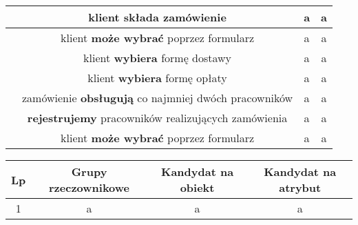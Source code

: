 \documentclass[a4page]{article}
\begin{document}
\begin{table}
\begin{adjustwidth}{-4.5cm}{}
\begin{tabular}{|c|c|c|c|}
				\hline
					\next & klient \textbf{składa} zamówienie & a & a\\
				\hline
					\next & klient \textbf{może wybrać} poprzez formularz & a & a\\
				\hline
					\next & klient \textbf{wybiera} formę dostawy & a & a\\
				\hline
					\next & klient \textbf{wybiera} formę opłaty & a & a\\
				\hline
					\next & zamówienie \textbf{obsługują} co najmniej dwóch pracowników & a & a\\
				\hline
					\next & \textbf{rejestrujemy} pracowników realizujących zamówienia & a & a\\
				\hline
					\next & klient \textbf{może wybrać} poprzez formularz & a & a\\
				\hline
	
			\end{tabular}
		\end{adjustwidth}
	\end{table}

	\newpage

	\begin{table}
		\large

		\begin{tabular}{|c|c|c|c|}
		
			\hline
				Lp & Grupy rzeczownikowe & Kandydat na obiekt & Kandydat na atrybut\\
			\hline
				1 & a & a & a\\
			\hline

		\end{tabular}
	\end{table}
\end{document}
